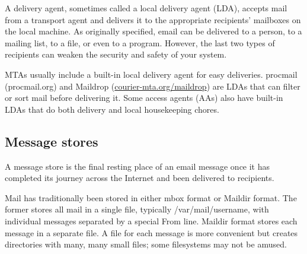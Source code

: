 \protect\hypertarget{part0026_split_005.htmlux5cux23_idIndexMarker2410}{}{}\protect\hypertarget{part0026_split_005.htmlux5cux23_idIndexMarker2411}{}{}\protect\hypertarget{part0026_split_005.htmlux5cux23_idIndexMarker2412}{}{}A
delivery agent, sometimes called a local delivery agent (LDA), accepts
mail from a transport agent and delivers it to the appropriate
recipients' mailboxes on the local machine. As originally specified,
email can be delivered to a person, to a mailing list, to a file, or
even to a program. However, the last two types of recipients can weaken
the security and safety of your system.

MTAs usually include a built-in local delivery agent for easy
deliveries.
\protect\hypertarget{part0026_split_005.htmlux5cux23_idIndexMarker2413}{}{}{procmail}
(procmail.org) and
\protect\hypertarget{part0026_split_005.htmlux5cux23_idIndexMarker2414}{}{}Maildrop
(\href{http://courier-mta.org/maildrop}{courier-mta.org/maildrop}) are
LDAs that can filter or sort mail before delivering it. Some access
agents (AAs) also have built-in LDAs that do both delivery and local
housekeeping chores.

\protect\hypertarget{part0026_split_006.html}{}{}

\hypertarget{part0026_split_006.htmlux5cux23_idContainer1247}{}
\hypertarget{part0026_split_006.htmlux5cux23calibre_pb_5}{%
\subsection[Message
stores]{\texorpdfstring{\protect\hypertarget{part0026_split_006.htmlux5cux23_idTextAnchor1008}{}{}Message
stores}{Message stores}}\label{part0026_split_006.htmlux5cux23calibre_pb_5}}

A message store is the final resting place of an email message once it
has completed its journey across the Internet and been delivered to
recipients.

Mail has traditionally been stored in either
\protect\hypertarget{part0026_split_006.htmlux5cux23_idIndexMarker2415}{}{}\protect\hypertarget{part0026_split_006.htmlux5cux23_idIndexMarker2416}{}{}{mbox}
format or
\protect\hypertarget{part0026_split_006.htmlux5cux23_idIndexMarker2417}{}{}\protect\hypertarget{part0026_split_006.htmlux5cux23_idIndexMarker2418}{}{}{Maildir}
format. The former stores all mail in a single file, typically
{/var/mail/}{username}, with individual messages separated by a special
From line. {Maildir} format stores each message in a separate file. A
file for each message is more convenient but creates directories with
many, many small files; some filesystems may not be amused.

